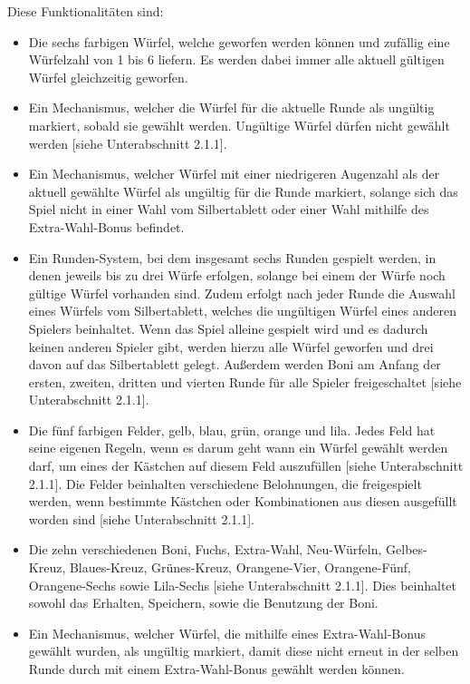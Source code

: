 Diese Funktionalitäten sind:
\begin{itemize}
\item Die sechs farbigen Würfel, welche geworfen werden können und zufällig eine Würfelzahl von 1 bis 6 liefern. Es werden dabei immer alle aktuell gültigen Würfel gleichzeitig geworfen.

\item Ein Mechanismus, welcher die Würfel für die aktuelle Runde als ungültig markiert, sobald sie gewählt werden. Ungültige Würfel dürfen nicht gewählt werden [siehe Unterabschnitt 2.1.1].

\item Ein Mechanismus, welcher Würfel mit einer niedrigeren Augenzahl als der aktuell gewählte Würfel als ungültig für die Runde markiert, solange sich das Spiel nicht in einer Wahl vom Silbertablett oder einer Wahl mithilfe des Extra-Wahl-Bonus befindet.

\item Ein Runden-System, bei dem insgesamt sechs Runden gespielt werden, in denen jeweils bis zu drei Würfe erfolgen, solange bei einem der Würfe noch gültige Würfel vorhanden sind. Zudem erfolgt nach jeder Runde die Auswahl eines Würfels vom Silbertablett, welches die ungültigen Würfel eines anderen Spielers beinhaltet. Wenn das Spiel alleine gespielt wird und es dadurch keinen anderen Spieler gibt, werden hierzu alle Würfel geworfen und drei davon auf das Silbertablett gelegt. Außerdem werden Boni am Anfang der ersten, zweiten, dritten und vierten Runde für alle Spieler freigeschaltet [siehe Unterabschnitt 2.1.1].

\item Die fünf farbigen Felder, gelb, blau, grün, orange und lila. Jedes Feld hat seine eigenen Regeln, wenn es darum geht wann ein Würfel gewählt werden darf, um eines der Kästchen auf diesem Feld auszufüllen [siehe Unterabschnitt 2.1.1]. Die Felder beinhalten verschiedene Belohnungen, die freigespielt werden, wenn bestimmte Kästchen oder Kombinationen aus diesen ausgefüllt worden sind [siehe Unterabschnitt 2.1.1].

\item Die zehn verschiedenen Boni, Fuchs, Extra-Wahl, Neu-Würfeln, Gelbes-Kreuz, Blaues-Kreuz, Grünes-Kreuz, Orangene-Vier, Orangene-Fünf, Orangene-Sechs sowie Lila-Sechs [siehe Unterabschnitt 2.1.1]. Dies beinhaltet sowohl das Erhalten, Speichern, sowie die Benutzung der Boni.

\item Ein Mechanismus, welcher Würfel, die mithilfe eines Extra-Wahl-Bonus gewählt wurden, als ungültig markiert, damit diese nicht erneut in der selben Runde durch mit einem Extra-Wahl-Bonus gewählt werden können.


\end{itemize}
